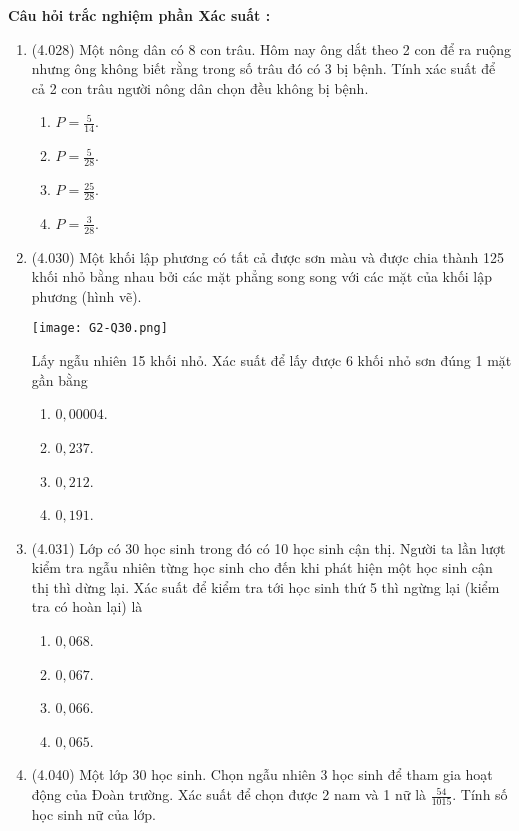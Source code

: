 \noindent\textbf{Câu hỏi trắc nghiệm phần Xác suất \cite{truc2018xay}:}
\begin{enumerate}[label=\textbf{Câu \arabic*.},align=left,left=0cm..0cm,itemindent=*]
	\item (4.028) Một nông dân có 8 con trâu. Hôm nay ông dắt theo 2 con để ra ruộng nhưng ông không biết rằng trong số trâu đó có 3 bị bệnh. Tính xác suất để cả 2 con trâu người nông dân chọn đều không bị bệnh.
	\begin{enumerate}[label=\textbf{\Alph*.},align=left,left=1cm..0cm,itemindent=*]
		\item $P=\frac 5{14}$. \item $P=\frac 5{28}$. \item $P=\frac{25}{28}$. \item $P=\frac 3{28}$.
	\end{enumerate}
	\item (4.030) Một khối lập phương có tất cả được sơn màu và được chia thành 125 khối nhỏ bằng nhau bởi các mặt phẳng song song với các mặt của khối lập phương (hình vẽ).\par
	{\centering\texttt{[image: G2-Q30.png]}\par}
	Lấy ngẫu nhiên 15 khối nhỏ. Xác suất để lấy được 6 khối nhỏ sơn đúng 1 mặt gần bằng
	\begin{enumerate}[label=\textbf{\Alph*.},align=left,left=1cm..0cm,itemindent=*]
		\item $0,00004$. \item $0,237$. \item $0,212$. \item $0,191$.
	\end{enumerate}
	\item (4.031) Lớp có 30 học sinh trong đó có 10 học sinh cận thị. Người ta lần lượt kiểm tra ngẫu nhiên từng học sinh cho đến khi phát hiện một học sinh cận thị thì dừng lại. Xác suất để kiểm tra tới học sinh thứ 5 thì ngừng lại (kiểm tra có hoàn lại) là
	\begin{enumerate}[label=\textbf{\Alph*.},align=left,left=1cm..0cm,itemindent=*]
		\item $0,068$. \item $0,067$. \item $0,066$. \item $0,065$.
	\end{enumerate}
	\item (4.040) Một lớp 30 học sinh. Chọn ngẫu nhiên 3 học sinh để tham gia hoạt động của Đoàn trường. Xác suất để chọn được 2 nam và 1 nữ là $\frac{54}{1015}$. Tính số học sinh nữ của lớp.

\end{enumerate}

